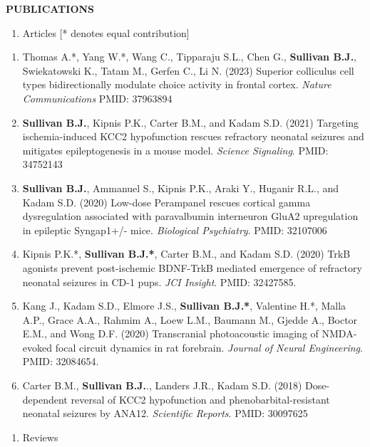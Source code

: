\documentclass{resume} %
\begin{document}
\begin{rSection}{{\bfseries PUBLICATIONS}}

    \begin{enumerate}[resume, leftmargin=0pt]
        \item [] Articles [* denotes equal contribution]
         \end{enumerate}

    \begin{enumerate}[resume, leftmargin=2em]
        \item Thomas A.*, Yang W.*, Wang C., Tipparaju S.L., Chen G., {\bfseries Sullivan B.J.}, Swiekatowski K., Tatam M., Gerfen C., Li N. (2023) Superior colliculus cell types bidirectionally modulate choice activity in frontal cortex. \emph{Nature Communications} PMID: 37963894
        \item {\bfseries Sullivan B.J.}, Kipnis P.K., Carter B.M., and Kadam S.D. (2021) Targeting ischemia-induced KCC2 hypofunction rescues refractory neonatal seizures and mitigates epileptogenesis in a mouse model. \emph{Science Signaling}. PMID: 34752143
        \item {\bfseries Sullivan B.J.}, Ammanuel S., Kipnis P.K., Araki Y., Huganir R.L., and Kadam S.D. (2020) Low-dose Perampanel rescues cortical gamma dysregulation associated with paravalbumin interneuron GluA2 upregulation in epileptic Syngap1+/- mice. \emph{Biological Psychiatry}. PMID: 32107006
        \item Kipnis P.K.*, {\bfseries Sullivan B.J.*}, Carter B.M., and Kadam S.D. (2020) TrkB agonists prevent post-ischemic BDNF-TrkB mediated emergence of refractory neonatal seizures in CD-1 pups. \emph{JCI Insight}. PMID: 32427585. 
        \item Kang J., Kadam S.D., Elmore J.S., {\bfseries Sullivan B.J.*}, Valentine H.*, Malla A.P., Grace A.A., Rahmim A., Loew L.M., Baumann M., Gjedde A., Boctor E.M., and Wong D.F. (2020) Transcranial photoacoustic imaging of NMDA-evoked focal circuit dynamics in rat forebrain. \emph{Journal of Neural Engineering}. PMID: 32084654. 
        \item Carter B.M., {\bfseries Sullivan B.J.}., Landers J.R., Kadam S.D. (2018) Dose-dependent reversal of KCC2 hypofunction and phenobarbital-resistant neonatal seizures by ANA12. \emph{Scientific Reports}. PMID: 30097625
    \end{enumerate}
    \begin{enumerate}[leftmargin=0pt]
        \item [] Reviews
    \end{enumerate}


\end{rSection}
\end{document}
